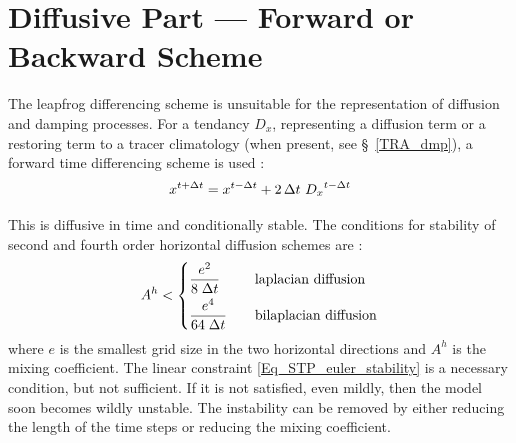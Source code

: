 \section{Diffusive Part --- Forward or Backward Scheme}
\label{STP_forward_imp}

The leapfrog differencing scheme is unsuitable for the representation of 
diffusion and damping processes. For a tendancy $D_x$, representing a 
diffusion term or a restoring term to a tracer climatology 
(when present, see \S~\ref{TRA_dmp}), a forward time differencing scheme
 is used :
\begin{equation} \label{Eq_STP_euler}
   x^{t+\Delta t} = x^{t-\Delta t} + 2 \, \Delta t \ {D_x}^{t-\Delta t}
\end{equation} 

This is diffusive in time and conditionally stable. The 
conditions for stability of second and fourth order horizontal diffusion schemes are \citep{Griffies_Bk04}:
\begin{equation} \label{Eq_STP_euler_stability}
A^h < \left\{
\begin{aligned}
                    &\frac{e^2}{  8 \; \Delta t } 	&&\quad \text{laplacian diffusion} 	\\
                    &\frac{e^4}{64 \; \Delta t } 	&&\quad \text{bilaplacian diffusion} 
            \end{aligned}
\right.
\end{equation}
where $e$ is the smallest grid size in the two horizontal directions and $A^h$ is 
the mixing coefficient. The linear constraint \eqref{Eq_STP_euler_stability} 
is a necessary condition, but not sufficient. If it is not satisfied, even mildly, 
then the model soon becomes wildly unstable. The instability can be removed 
by either reducing the length of the time steps or reducing the mixing coefficient.

